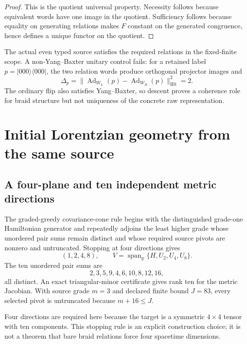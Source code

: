 \documentclass[11pt]{article}
\theoremstyle{definition}
\theoremstyle{remark}
\newcommand{\Span}{\operatorname{span}}
\begin{document}
\begin{proof}
This is the quotient universal property. Necessity follows because equivalent words have one image in the quotient. Sufficiency follows because equality on generating relations makes $F$ constant on the generated congruence, hence defines a unique functor on the quotient.
\end{proof}

The actual even typed source satisfies the required relations in the fixed-finite scope. A non-Yang--Baxter unitary control fails: for a retained label $p=|000\rangle\langle000|$, the two relation words produce orthogonal projector images and
\begin{equation}
  \Delta_p=\|\operatorname{Ad}_{W_L}(p)-\operatorname{Ad}_{W_R}(p)\|_{\mathrm{HS}}^2=2.
\end{equation}
The ordinary flip also satisfies Yang--Baxter, so descent proves a coherence role for braid structure but not uniqueness of the concrete raw representation.

\section{Initial Lorentzian geometry from the same source}

\subsection{A four-plane and ten independent metric directions}

The graded-greedy covariance-cone rule begins with the distinguished grade-one Hamiltonian generator and repeatedly adjoins the least higher grade whose unordered pair sums remain distinct and whose required source pivots are nonzero and untruncated. Stopping at four directions gives
\begin{equation}
  (1,2,4,8),\qquad
  V=\Span_{\mathbb{R}}\{H,U_2,U_4,U_8\}.
\end{equation}
The ten unordered pair sums are
\begin{equation}
  2,3,5,9,4,6,10,8,12,16,
\end{equation}
all distinct. An exact triangular-minor certificate gives rank ten for the metric Jacobian. With source grade $m=3$ and declared finite bound $J=83$, every selected pivot is untruncated because $m+16\le J$.

Four directions are required here because the target is a symmetric $4\times4$ tensor with ten components. This stopping rule is an explicit construction choice; it is not a theorem that bare braid relations force four spacetime dimensions.
\end{document}
